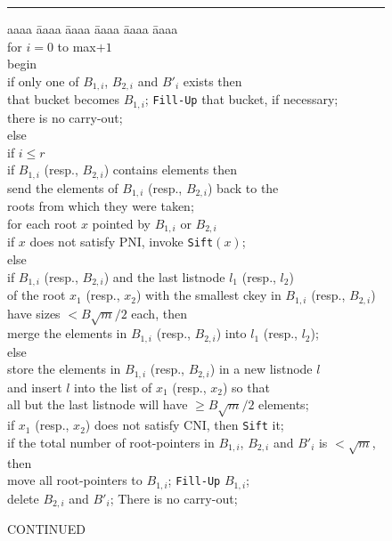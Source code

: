 \begin{figure}
\vspace{0.2in}
\hrule
\begin{tabbing}
aaaa \= aaaa \= aaaa \= aaaa \= aaaa \= aaaa \kill \\
for $i=0$ to max$+1$ \\
begin \\
\> if only one of $B_{1,i}$, $B_{2,i}$ and $B'_{i}$ exists then \\
\>\>that bucket becomes $B_{1,i}$; {\tt Fill-Up} that bucket, if necessary; \\
\>\>there is no carry-out; \\
\> else \\
\>\>if $i\leq r$ \\
\>\>\>if $B_{1,i}$ (resp., $B_{2,i}$) contains elements then \\
\>\>\>\> send the elements of $B_{1,i}$ (resp., $B_{2,i}$) back to the \\
\>\>\>\>roots from which they were taken; \\ 
\>\>\>for each root $x$ pointed by $B_{1,i}$ or $B_{2,i}$ \\ 
\>\>\>\>if $x$ does not satisfy PNI, invoke {\tt Sift}$(x)$; \\ 
\>\>else \\ 
\>\>\>if $B_{1,i}$ (resp., $B_{2,i}$) and the last listnode $l_1$ (resp., $l_2$) \\
\>\>\>of the root $x_1$ (resp., $x_2$) with the smallest ckey in $B_{1,i}$ (resp., $B_{2,i}$) \\
\>\>\>have sizes $<B\sqrt{m}/2$ each, then \\ 
\>\>\>\>merge the elements in $B_{1,i}$ (resp., $B_{2,i}$) into $l_1$ (resp., $l_2$); \\ 
\>\>\>else \\ 
\>\>\>\>store the elements in $B_{1,i}$ (resp., $B_{2,i}$) in a new listnode $l$\\ 
\>\>\>\>and insert $l$ into the list of $x_1$ (resp., $x_2$) so that \\
\>\>\>\>all but the last listnode will have $\geq B\sqrt{m}/2$ elements; \\ 
\>\>\>\>if $x_1$ (resp., $x_2$) does not satisfy CNI, then {\tt Sift} it; \\ 
\>if the total number of root-pointers in $B_{1,i}$, $B_{2,i}$ and $B'_{i}$ is $<\sqrt{m}$, then  \\
\>\>move all root-pointers to $B_{1,i}$; {\tt Fill-Up} $B_{1,i}$; \\
\>\>delete $B_{2,i}$ and $B'_{i}$; There is no carry-out; \\
\end{tabbing}
\hfill {CONTINUED}
\label{fig:meld1}
\end{figure}

